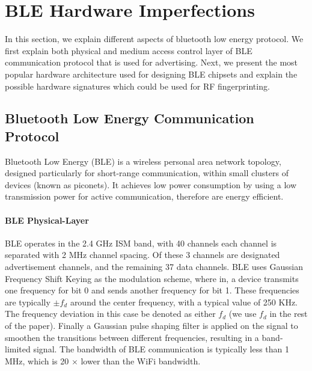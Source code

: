 \section{BLE Hardware Imperfections}
\label{sec:background}

In this section, we explain different aspects of bluetooth low energy protocol. We first explain both physical and medium access control layer of BLE communication protocol that is used for advertising. Next, we present the most popular hardware architecture used for designing BLE chipsets and explain the possible hardware signatures which could be used for RF fingerprinting. 

\subsection{Bluetooth Low Energy Communication Protocol}

Bluetooth Low Energy (BLE) is a wireless personal area network topology, designed particularly for short-range communication, within small clusters of devices (known as piconets). It achieves low power consumption by using a low transmission power for active communication, therefore are energy efficient.

\paragraph{BLE Physical-Layer} BLE operates in the 2.4 GHz ISM band, with 40 channels each channel is separated with 2 MHz channel spacing. Of these 3 channels are designated advertisement channels, and the remaining 37 data channels. BLE uses Gaussian Frequency Shift Keying as the modulation scheme, where in, a device transmits one frequency for bit 0 and sends another frequency for bit 1. These frequencies are typically $\pm f_d$ around the center frequency, with a typical value of 250 KHz. The frequency deviation in this case be denoted as either $f_d$ (we use $f_d$ in the rest of the paper). Finally a Gaussian pulse shaping filter is applied on the signal to smoothen the transitions between different frequencies, resulting in a band-limited signal. The bandwidth of BLE communication is typically less than 1 MHz, which is 20 $\times$ lower than the WiFi bandwidth. 

